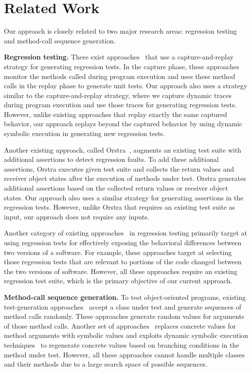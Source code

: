\section{Related Work}
\label{sec:related}

Our approach is closely related to two major research areas: regression testing and method-call sequence generation.

\textbf{Regression testing.} There exist approaches~\cite{Elbaum:capture, orso:capture, david:java} that use a capture-and-replay strategy for generating regression tests. In the capture phase, these approaches monitor the methods called during program execution and uses these method calls in the replay phase to generate unit tests. Our approach also uses a strategy similar to the capture-and-replay strategy, where we capture dynamic traces during program execution and use those traces for generating regression tests. However, unlike existing approaches that replay exactly the same captured behavior, our approach replays beyond the captured behavior by using dynamic symbolic execution in generating new regression tests.

Another existing approach, called Orstra~\cite{xie06:augmenting}, augments an existing test suite with additional assertions to detect regression faults. To add these additional assertions, Orstra executes given test suite and collects the return values and receiver object states after the execution of methods under test. Orstra generates additional assertions based on the collected return values or receiver object states. Our approach also uses a similar strategy for generating assertions in the regression tests. However, unlike Orstra that requires an existing test suite as input, our approach does not require any inputs.

Another category of existing approaches~\cite{DeMillo91:constraint, taneja08:diffgen, evans07:differential} in regression testing primarily target at using regression tests for effectively exposing the behavioral differences between two versions of a software. For example, these approaches target at selecting those regression tests that are relevant to portions of the code changed between the two versions of software. However, all these approaches require an existing regression test suite, which is the primary objective of our current approach.

\textbf{Method-call sequence generation.} To test object-oriented programs, existing test-generation approaches~\cite{csallner:jcrasher, JTEST, pacheco:eclat, xie:rostra} accept a class under test and generate sequences of method calls randomly. These approaches generate random values for arguments of those method calls. Another set of approaches~\cite{inkumsah08:improving} replaces concrete values for method arguments with symbolic values and exploits dynamic symbolic execution techniques~\cite{Clarke:symbolic, godefroid:dart, king:symex, koushik:cute} to regenerate concrete values based on branching conditions in the method under test. However, all these approaches cannot handle multiple classes and their methods due to a large search space of possible sequences.

